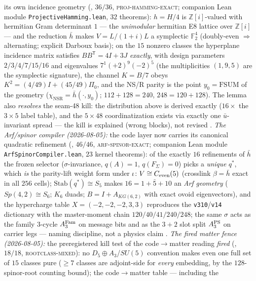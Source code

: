 \documentclass[11pt,a4paper]{article}
\newcommand{\Z}{\mathbb{Z}}
\theoremstyle{definition}
\begin{document}
\begin{keybox}
its own incidence geometry
(, $36/36$,
\textsc{proj-hamming-exact}; companion Lean module
\texttt{ProjectiveHamming.lean}, $32$ theorems): $h=H/4$ is
$\Z[i]$-valued with hermitian Gram determinant $1$ --- the
\emph{unimodular} hermitian E8 lattice over $\Z[i]$ --- and the
reduction $\bar h$ makes $V=L/(1+i)L$ a symplectic
$\mathbb{F}_2^4$ (doubly-even $\Rightarrow$ alternating; explicit
Darboux basis); on the $15$ nonzero classes the hyperplane
incidence matrix satisfies $BB^{\mathsf T}=4I+3J$ \emph{exactly},
with design parameters $2/3/4/7/15/16$ and eigenvalues
$7^1(+2)^9(-2)^5$ (the multiplicities $(1,9,5)$ are the symplectic
signature), the channel $K=B/7$ obeys
$K^2=(4/49)I+(45/49)\Pi_0$, and the NS/R parity is the point
$y_0=\mathrm{FSUM}$ of the geometry
($\chi_{\mathrm{NSR}}=\bar h(\cdot,y_0)$; $112+128=240$,
$248=120+128$).  The lemma also \emph{resolves} the seam-48 kill:
the distribution above is derived exactly ($16\times$ the
$3\times5$ label table), and the $5\times48$ coordinatization
exists via exactly one $\bar u$-invariant spread --- the kill is
explained (wrong blocks), not revised \mE.
\emph{The Arf/spinor compiler (2026-08-05):} the code layer now
carries its canonical quadratic refinement
(, $46/46$,
\textsc{arf-spinor-exact}; companion Lean module
\texttt{ArfSpinorCompiler.lean}, $23$ kernel theorems): of the
exactly $16$ refinements of $\bar h$ the frozen selector
($\sigma$-invariance, $q(A){=}1$, $q(F_\Sigma){=}0$) picks a
\emph{unique} $q^{*}$, which \emph{is} the parity-lift weight form
under $\iota\colon V\cong C_{\rm even}(5)$ (crosslink
$\beta=\bar h$ exact in all $256$ cells); $\mathrm{Stab}(q^{*})\cong
S_5$ makes $16=1+\bar 5+10$ an \emph{Arf geometry}
($Sp(4,2)\cong S_6$; $K_6$ duads; $B=I+A_{KG(6,2)}$ with exact
ovoid eigenvectors), and the hypercharge table
$X=(-2,-2,-2,3,3)$ reproduces the \texttt{v310}/\texttt{v14}
dictionary with the master-moment chain $120/40/41/240/248$;
the same $\sigma$ acts as the family 3-cycle $A_3^{\rm Fam}$ on
message bits and as the $3{+}2$ slot split $A_3^{\rm PS}$ on
carrier legs --- naming discipline, not a physics claim \mE.
\emph{The fired matter fence (2026-08-05):} the preregistered
kill test of the code$\to$matter reading \emph{fired}
(, $18/18$,
\textsc{rootclass-mixed}): no $D_5{\oplus}A_3$/$SU(5)$ convention
makes even one full set of $15$ classes pure ($\ge7$ classes are
adjoint-side for \emph{every} embedding, by the $128$-spinor-root
counting bound); the code$\to$matter table --- including the

\end{keybox}
\end{document}
